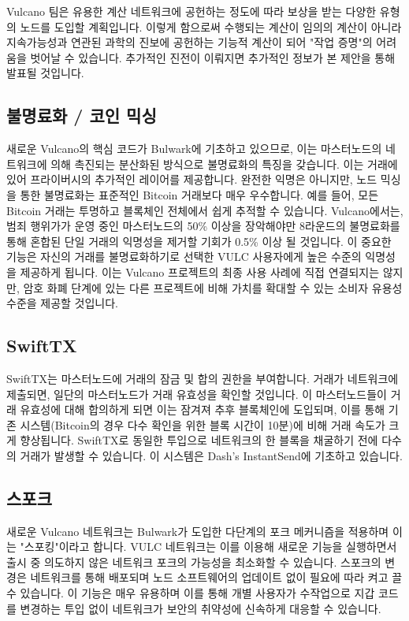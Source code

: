 \documentclass[A4paper, 12pt]{article}
\begin{document}
Vulcano 팀은 유용한 계산 네트워크에 공헌하는 정도에 따라 보상을 받는 다양한 유형의 노드를 도입할 계획입니다. 이렇게 함으로써 수행되는 계산이 임의의 계산이 아니라 지속가능성과 연관된 과학의 진보에 공헌하는 기능적 계산이 되어 "작업 증명"의 어려움을 벗어날 수 있습니다. 추가적인 진전이 이뤄지면 추가적인 정보가 본 제안을 통해 발표될 것입니다.

\subsection{불명료화 / 코인 믹싱}
새로운 Vulcano의 핵심 코드가 Bulwark에 기초하고 있으므로, 이는 마스터노드의 네트워크에 의해 촉진되는 분산화된 방식으로 불명료화의 특징을 갖습니다. 이는 거래에 있어 프라이버시의 추가적인 레이어를 제공합니다. 완전한 익명은 아니지만, 노드 믹싱을 통한 불명료화는 표준적인 Bitcoin 거래보다 매우 우수합니다. 예를 들어, 모든 Bitcoin 거래는 투명하고 블록체인 전체에서 쉽게 추적할 수 있습니다. Vulcano에서는, 범죄 행위가가 운영 중인 마스터노드의 50\% 이상을 장악해야만 8라운드의 불명료화를 통해 혼합된 단일 거래의 익명성을 제거할 기회가 0.5\% 이상 될 것입니다. 이 중요한 기능은 자신의 거래를 불명료화하기로 선택한 VULC 사용자에게 높은 수준의 익명성을 제공하게 됩니다. 이는 Vulcano 프로젝트의 최종 사용 사례에 직접 연결되지는 않지만, 암호 화폐 단계에 있는 다른 프로젝트에 비해 가치를 확대할 수 있는 소비자 유용성 수준을 제공할 것입니다.

\subsection{SwiftTX}
SwiftTX는 마스터노드에 거래의 잠금 및 합의 권한을 부여합니다. 거래가 네트워크에 제출되면, 일단의 마스터노드가 거래 유효성을 확인할 것입니다. 이 마스터노드들이 거래 유효성에 대해 합의하게 되면 이는 잠겨져 추후 블록체인에 도입되며, 이를 통해 기존 시스템(Bitcoin의 경우 다수 확인을 위한 블록 시간이 10분)에 비해 거래 속도가 크게 향상됩니다. SwiftTX로 동일한 투입으로 네트워크의 한 블록을 채굴하기 전에 다수의 거래가 발생할 수 있습니다. 이 시스템은 Dash’s InstantSend에 기초하고 있습니다.

\subsection{스포크}
새로운 Vulcano 네트워크는 Bulwark가 도입한 다단계의 포크 메커니즘을 적용하며 이는 "스포킹"이라고 합니다. VULC 네트워크는 이를 이용해 새로운 기능을 실행하면서 출시 중 의도하지 않은 네트워크 포크의 가능성을 최소화할 수 있습니다. 스포크의 변경은 네트워크를 통해 배포되며 노드 소프트웨어의 업데이트 없이 필요에 따라 켜고 끌 수 있습니다. 이 기능은 매우 유용하며 이를 통해 개별 사용자가 수작업으로 지갑 코드를 변경하는 투입 없이 네트워크가 보안의 취약성에 신속하게 대응할 수 있습니다.
\end{document}
